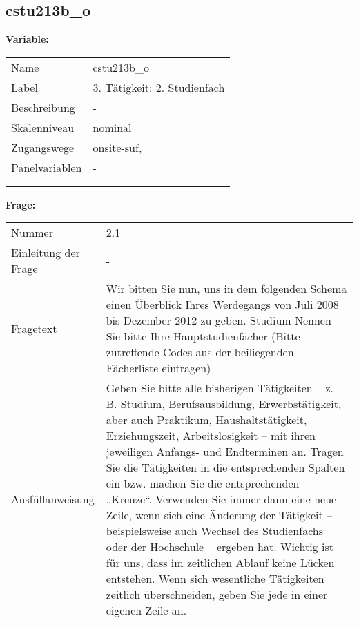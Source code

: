 	
	
	\subsection{cstu213b\_o}
	\label{subSection:cstu213b_o}

	\noindent\textbf{Variable:}\\
		\begin{tabular}{lL{11.3cm}}
			\label{tableVariable:cstu213b_o}
			Name & cstu213b\_o \\
			Label & 3. Tätigkeit: 2. Studienfach \\
			Beschreibung & - \\
			Skalenniveau & nominal \\
			Zugangswege &
				onsite-suf,
 \\
			Panelvariablen & -
			 \\
			 \\
 \\
		\end{tabular}

		\vspace*{1 cm}
		\noindent\textbf{Frage:}\\
		\begin{tabular}{lL{11.3cm}}
			\label{tableQuestion:cstu213b_o}
			Nummer & 2.1 \\
			Einleitung der Frage & - \\
			Fragetext & Wir bitten Sie nun, uns in dem folgenden Schema einen Überblick Ihres Werdegangs von Juli 2008 bis Dezember 2012 zu geben.
Studium
Nennen Sie bitte Ihre Hauptstudienfächer
(Bitte zutreffende Codes aus der beiliegenden Fächerliste eintragen) \\
			Ausfüllanweisung & Geben Sie bitte alle bisherigen Tätigkeiten – z. B. Studium, Berufsausbildung, Erwerbstätigkeit, aber auch Praktikum, Haushaltstätigkeit,
Erziehungszeit, Arbeitslosigkeit – mit ihren jeweiligen Anfangs- und Endterminen an. Tragen Sie die Tätigkeiten in die entsprechenden Spalten ein bzw. machen Sie die entsprechenden „Kreuze“. Verwenden Sie immer dann eine neue Zeile, wenn sich eine Änderung der Tätigkeit – beispielsweise auch Wechsel des Studienfachs oder der Hochschule – ergeben hat. Wichtig ist für uns, dass im zeitlichen Ablauf keine Lücken entstehen. Wenn sich wesentliche Tätigkeiten zeitlich überschneiden, geben Sie jede in einer eigenen Zeile an. \\
		\end{tabular}






